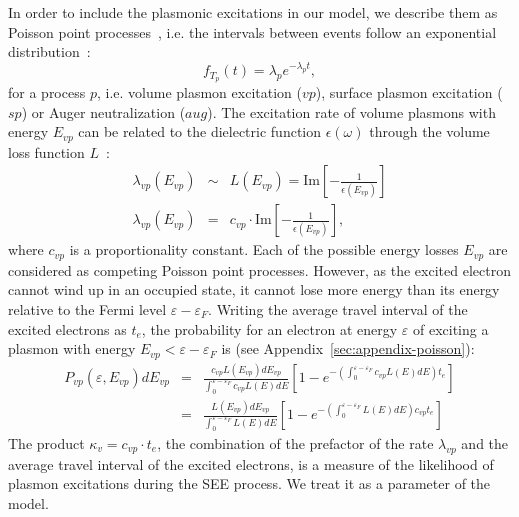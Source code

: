 \begin{refsection}
In order to include the plasmonic excitations in our model, we describe 
them as Poisson point processes~\cite{Egerton2009}, i.e. the intervals between events follow an 
exponential distribution~\cite{MITopencourseware}: 
\begin{equation} 
f_{T_p} (t) = \lambda_p e^{-\lambda_p t}, 
\end{equation} 
for a process $p$, i.e. volume plasmon excitation ($vp$), surface plasmon 
excitation ($sp$) or Auger neutralization ($aug$). The 
excitation rate of volume plasmons with energy $E_{vp}$ can be related to the 
dielectric function $\epsilon (\omega)$ through the volume loss function 
$L$~\cite{Raether1980}: 
\begin{eqnarray} 
\lambda_{vp}(E_{vp}) &\sim& L(E_{vp}) =
\text{Im}\left[-\frac{1}{\epsilon(E_{vp})}\right] \\
\lambda_{vp}(E_{vp}) &=& c_{vp} \cdot \text{Im}\left[-\frac{1}{\epsilon(E_{vp})}\right],
\end{eqnarray} 
where $c_{vp}$ is a proportionality constant.
Each of the possible energy losses $E_{vp}$ are considered as competing Poisson 
point processes. However, as the excited electron cannot wind up in an 
occupied state, it cannot lose more energy than its energy relative to the 
Fermi level $\varepsilon - \varepsilon_F$. Writing the average travel 
interval of the excited electrons as $t_e$, the probability for an electron at 
energy $\varepsilon$ of exciting a plasmon with energy $E_{vp} < \varepsilon - 
\varepsilon_F$ is (see Appendix~\ref{sec:appendix-poisson}): 
\begin{eqnarray} \label{quotas:eq-vp_prob}
P_{vp}(\varepsilon, E_{vp}) dE_{vp} &=& \frac{c_{vp} 
L(E_{vp})dE_{vp}}{\int_0^{\varepsilon - \varepsilon_F} c_{vp} L(E) dE
}\left[1-e^{-\left(\int_0^{\varepsilon - \varepsilon_F} c_{vp} L(E) dE\right) t_e 
}\right] \\ 
&=& \frac{L(E_{vp})dE_{vp}}{\int_0^{\varepsilon - \varepsilon_F} L(E) dE
}\left[1-e^{-\left(\int_0^{\varepsilon - \varepsilon_F} L(E) dE\right) c_{vp} t_e 
}\right] 
\end{eqnarray} 
The product $\kappa_v = c_{vp} \cdot t_e$, the combination of the prefactor of the 
rate $\lambda_{vp}$ and the average travel interval of the excited electrons, is a 
measure of the likelihood of plasmon excitations during the SEE process. We 
treat it as a parameter of the model. 
 

\end{refsection}
